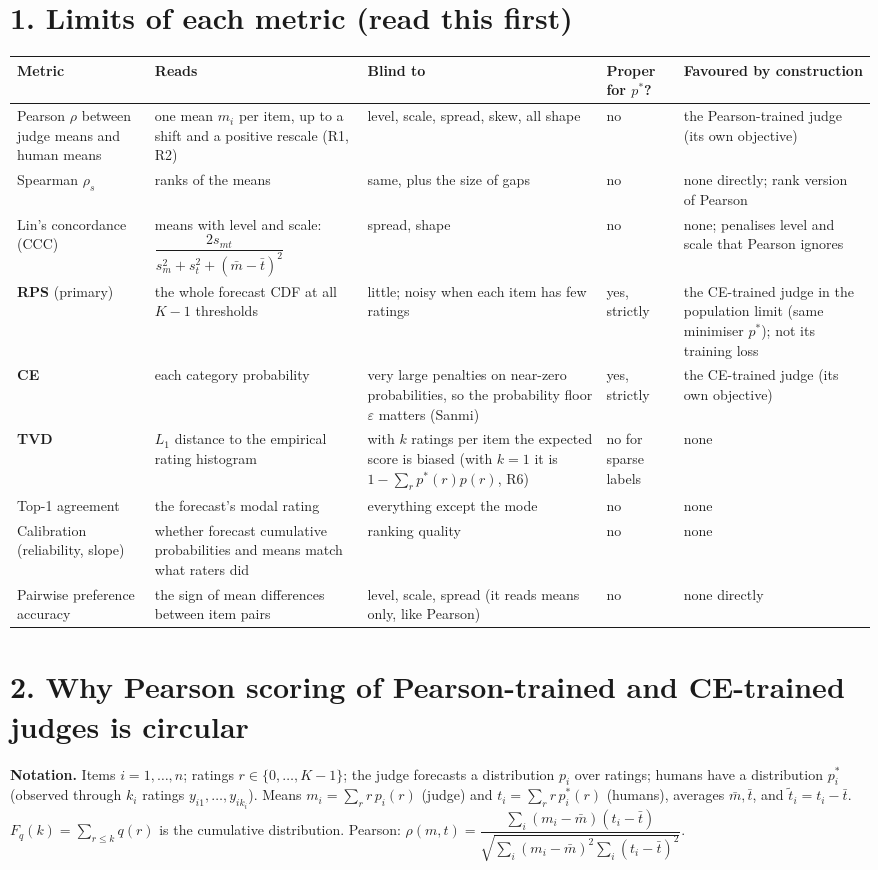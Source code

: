 \documentclass[10.5pt]{article}
\newcommand{\ra}{\raggedright\arraybackslash}
\begin{document}
\section*{1. Limits of each metric (read this first)}
{\small\renewcommand{\arraystretch}{1.15}
\begin{longtable}{@{}>{\ra}p{2.5cm}>{\ra}p{3.7cm}>{\ra}p{3.9cm}>{\ra}p{1.5cm}>{\ra}p{3.3cm}@{}}
\toprule
Metric & Reads & Blind to & Proper for $p^\ast$? & Favoured by construction\\
\midrule
Pearson $\rho$ between judge means and human means & one mean $m_i$ per item, up to a shift and a positive rescale (R1, R2) & level, scale, spread, skew, all shape & no & the Pearson-trained judge (its own objective)\\
Spearman $\rho_s$ & ranks of the means & same, plus the size of gaps & no & none directly; rank version of Pearson\\
Lin's concordance (CCC) & means with level and scale: $\dfrac{2s_{mt}}{s_m^2+s_t^2+(\bar m-\bar t)^2}$ & spread, shape & no & none; penalises level and scale that Pearson ignores\\
\textbf{RPS} (primary) & the whole forecast CDF at all $K-1$ thresholds & little; noisy when each item has few ratings & yes, strictly & the CE-trained judge in the population limit (same minimiser $p^\ast$); not its training loss\\
\textbf{CE} & each category probability & very large penalties on near-zero probabilities, so the probability floor $\varepsilon$ matters (Sanmi) & yes, strictly & the CE-trained judge (its own objective)\\
\textbf{TVD} & $L_1$ distance to the empirical rating histogram & with $k$ ratings per item the expected score is biased (with $k=1$ it is $1-\sum_r p^\ast(r)p(r)$, R6) & no for sparse labels & none\\
Top-1 agreement & the forecast's modal rating & everything except the mode & no & none\\
Calibration (reliability, slope) & whether forecast cumulative probabilities and means match what raters did & ranking quality & no & none\\
Pairwise preference accuracy & the sign of mean differences between item pairs & level, scale, spread (it reads means only, like Pearson) & no & none directly\\
\bottomrule
\end{longtable}}

\section*{2. Why Pearson scoring of Pearson-trained and CE-trained judges is circular}
\textbf{Notation.} Items $i=1,\dots,n$; ratings $r\in\{0,\dots,K-1\}$; the judge forecasts a distribution $p_i$ over ratings; humans have a distribution $p^\ast_i$ (observed through $k_i$ ratings $y_{i1},\dots,y_{ik_i}$). Means $m_i=\sum_r r\,p_i(r)$ (judge) and $t_i=\sum_r r\,p^\ast_i(r)$ (humans), averages $\bar m,\bar t$, and $\tilde t_i=t_i-\bar t$. $F_q(k)=\sum_{r\le k}q(r)$ is the cumulative distribution. Pearson: $\rho(m,t)=\dfrac{\sum_i(m_i-\bar m)(t_i-\bar t)}{\sqrt{\sum_i(m_i-\bar m)^2\sum_i(t_i-\bar t)^2}}$.
\end{document}

